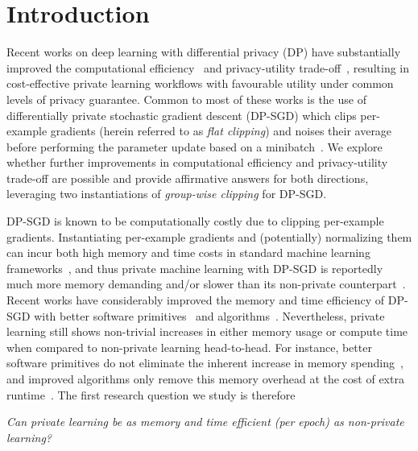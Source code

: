 \section{Introduction}
Recent works on deep learning with differential privacy (DP) have substantially improved the computational efficiency~\citep{subramani2021enabling,anil2021large} and privacy-utility trade-off~\citep{li2022does,yu2022differentially,de2022unlocking,mehta2022large}, resulting in cost-effective private learning workflows with favourable utility under common levels of privacy guarantee. 
Common to most of these works is the use of differentially private stochastic gradient descent (DP-SGD) which clips per-example gradients (herein referred to as \emph{flat clipping}) and noises their average before performing the parameter update based on a minibatch~\citep{song2013stochastic,bassily2014private,abadi2016deep}.
We explore whether further improvements in computational efficiency and privacy-utility trade-off are possible and provide affirmative answers for both directions, leveraging two instantiations of \emph{group-wise clipping} for DP-SGD. 


DP-SGD is known to be computationally costly due to clipping per-example gradients.
Instantiating per-example gradients and (potentially) normalizing them can incur both high memory and time costs in standard machine learning frameworks~\citep{paszke2019pytorch,frostig2018compiling}, and thus private machine learning with DP-SGD is reportedly much more memory demanding and/or slower than its non-private counterpart~\citep{carlini2019secret,hoory2021learning}. 
Recent works have considerably improved the memory and time efficiency of DP-SGD with better software primitives~\citep{subramani2021enabling} and algorithms~\citep{yousefpour2021opacus,lee2021scaling,li2022large,bu2022scalable}.
Nevertheless, private learning still shows non-trivial increases in either memory usage or compute time when compared to non-private learning head-to-head. 
For instance, better software primitives do not eliminate the inherent increase in memory spending~\citep{subramani2021enabling}, and improved algorithms only remove this memory overhead at the cost of extra runtime~\citep{li2022large}. 
The first research question we study is therefore
\renewenvironment{quote}
  {\list{}{\rightmargin=0.1in \leftmargin=0.1in}%
  \item\relax}
  {\endlist}
\begin{quote}
	\centering
	\emph{Can private learning be as memory and time efficient (per epoch) as non-private learning?}
\end{quote}

